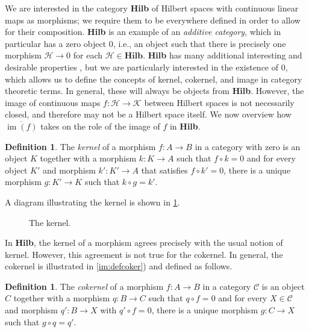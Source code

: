 \documentclass[11pt]{article}
\theoremstyle{definition}
\newtheorem{definition}[theorem]{Definition}
\theoremstyle{remark}
\DeclareMathOperator{\im}{im}
\newcommand{\Hh}{\mathcal{H}}
\newcommand{\Kk}{\mathcal{K}}
\begin{document}
\begin{appendices}
We are interested in the category \textbf{Hilb} of Hilbert spaces with continuous linear maps as morphisms; we require them to be everywhere defined in order to allow for their composition. \textbf{Hilb} is an example of an \textit{additive category}, which in particular has a zero object $0$, i.e., an object such that there is precisely one morphism $\Hh \to 0$ for each $\Hh \in \textbf{Hilb}$.  \textbf{Hilb} has many additional interesting and desirable properties \citep{cathilb}, but we are particularly interested in the existence of $0$, which allows us to define the concepts of kernel, cokernel, and image in category theoretic terms. In general, these will always be objects from \textbf{Hilb}. However, the image of continuous maps $f:\Hh \to \Kk$ between Hilbert spaces is not necessarily closed, and therefore may not be a Hilbert space itself. We now overview how $\overline{\im(f)}$ takes on the role of the image of $f$ in \textbf{Hilb}.

\begin{definition}\textnormal{\cite[Kernel,][p.~191]{maclane} }
    The \emph{kernel} of a morphism $f: A \to B$ in a category with zero is an object $K$ together with a morphism $k: K \to A$ such that $f \circ k = 0$ and for every object $K'$ and morphism $k': K' \to A$ that satisfies $f \circ k' = 0$, there is a unique morphism $g: K' \to K$ such that $k \circ g = k'$. 
\end{definition}
A diagram illustrating the kernel is shown in \cref{fig:kernel}.

\begin{figure}[h]
\begin{center}
\caption{The kernel.} \label{fig:kernel}
\end{center}
\end{figure}

In \textbf{Hilb}, the kernel of a morphism agrees precisely with the usual notion of kernel.
However, this agreement is not true for the cokernel. In general, the cokernel is illustrated in \cref{im:defcoker}) and defined as follows.
\begin{definition}\textnormal{\citep[Cokernel,][p.~64]{maclane}}
    The \emph{cokernel} of a morphism $f: A \to B$ in a category $\mathcal{C}$ is an object $C$ together with a morphism $q: B \to C$ such that $q \circ f = 0$ and for every $X \in \mathcal{C}$ and morphism $q': B \to X$ with $q' \circ f = 0$, there is a unique morphism $g: C \to X$ such that $g \circ q = q'$.
\end{definition}


\end{appendices}
\end{document}
